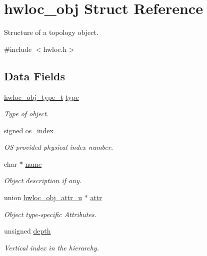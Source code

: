 \hypertarget{structhwloc__obj}{
\section{hwloc\_\-obj Struct Reference}
\label{structhwloc__obj}
}


Structure of a topology object.  


{\ttfamily \#include $<$hwloc.h$>$}\subsection*{Data Fields}
\begin{DoxyCompactItemize}
\item 
\hyperlink{group__hwlocality__types_gacd37bb612667dc437d66bfb175a8dc55}{hwloc\_\-obj\_\-type\_\-t} \hyperlink{structhwloc__obj_acc4f0803f244867e68fe0036800be5de}{type}
\begin{DoxyCompactList}\small\item\em Type of object. \item\end{DoxyCompactList}\item 
signed \hyperlink{structhwloc__obj_a79d45afa49e2bd18297660ac68820d91}{os\_\-index}
\begin{DoxyCompactList}\small\item\em OS-\/provided physical index number. \item\end{DoxyCompactList}\item 
char $\ast$ \hyperlink{structhwloc__obj_abb709ec38f2970677e4e57d1d30be96d}{name}
\begin{DoxyCompactList}\small\item\em Object description if any. \item\end{DoxyCompactList}\item 
union \hyperlink{unionhwloc__obj__attr__u}{hwloc\_\-obj\_\-attr\_\-u} $\ast$ \hyperlink{structhwloc__obj_accd40e29f71f19e88db62ea3df02adc8}{attr}
\begin{DoxyCompactList}\small\item\em Object type-\/specific Attributes. \item\end{DoxyCompactList}\item 
unsigned \hyperlink{structhwloc__obj_a9d82690370275d42d652eccdea5d3ee5}{depth}
\begin{DoxyCompactList}\small\item\em Vertical index in the hierarchy. \item\end{DoxyCompactList}\item 

\end{DoxyCompactItemize}
